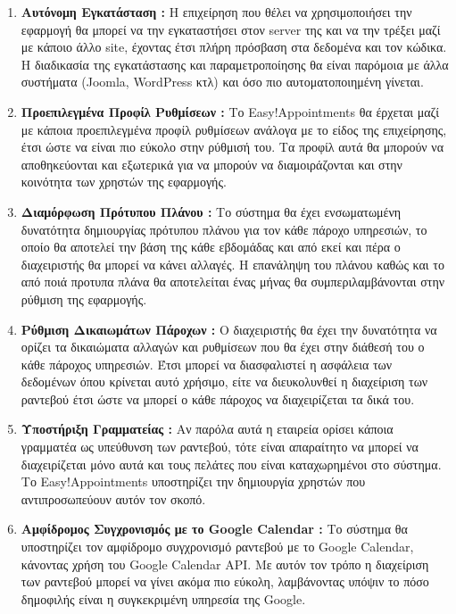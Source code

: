 \begin{enumerate}
\item {\bf Αυτόνομη Εγκατάσταση :} Η επιχείρηση που θέλει να χρησιμοποιήσει την εφαρμογή θα μπορεί να την εγκαταστήσει στον server της και να την τρέξει μαζί με κάποιο άλλο site, έχοντας έτσι πλήρη πρόσβαση στα δεδομένα και τον κώδικα. Η διαδικασία της εγκατάστασης και παραμετροποίησης θα είναι παρόμοια με άλλα συστήματα (Joomla, WordPress κτλ) και όσο πιο αυτοματοποιημένη γίνεται.

\item {\bf Προεπιλεγμένα Προφίλ Ρυθμίσεων :} Το Easy!Appointments θα έρχεται μαζί με κάποια προεπιλεγμένα προφίλ ρυθμίσεων ανάλογα με το είδος της επιχείρησης, έτσι ώστε να είναι πιο εύκολο στην ρύθμισή του. Τα προφίλ αυτά θα μπορούν να αποθηκεύονται και εξωτερικά για να μπορούν να διαμοιράζονται και στην κοινότητα των χρηστών της εφαρμογής.

\item {\bf Διαμόρφωση Πρότυπου Πλάνου :} Το σύστημα θα έχει ενσωματωμένη δυνατότητα δημιουργίας πρότυπου πλάνου για τον κάθε πάροχο υπηρεσιών, το οποίο θα αποτελεί την βάση της κάθε εβδομάδας και από εκεί και πέρα ο διαχειριστής θα μπορεί να κάνει αλλαγές. Η επανάληψη του πλάνου καθώς και το από ποιά προτυπα πλάνα θα αποτελείται ένας μήνας θα συμπεριλαμβάνονται στην ρύθμιση της εφαρμογής.

\item {\bf Ρύθμιση Δικαιωμάτων Πάροχων :} Ο διαχειριστής θα έχει την δυνατότητα να ορίζει τα δικαιώματα αλλαγών και ρυθμίσεων που θα έχει στην διάθεσή του ο κάθε πάροχος υπηρεσιών. Έτσι μπορεί να διασφαλιστεί η ασφάλεια των δεδομένων όπου κρίνεται αυτό χρήσιμο, είτε να διευκολυνθεί η διαχείριση των ραντεβού έτσι ώστε να μπορεί ο κάθε πάροχος να διαχειρίζεται τα δικά του.

\item {\bf Υποστήριξη Γραμματείας :} Αν παρόλα αυτά η εταιρεία ορίσει κάποια γραμματέα ως υπεύθυνση των ραντεβού, τότε είναι απαραίτητο να μπορεί να διαχειρίζεται μόνο αυτά και τους πελάτες που είναι καταχωρημένοι στο σύστημα. Το Easy!Appointments υποστηρίζει την δημιουργία χρηστών που αντιπροσωπεύουν αυτόν τον σκοπό.

\item {\bf Αμφίδρομος Συγχρονισμός με το Google Calendar :} Το σύστημα θα υποστηρίζει τον αμφίδρομο συγχρονισμό ραντεβού με το Google Calendar, κάνοντας χρήση του Google Calendar API. Με αυτόν τον τρόπο η διαχείριση των ραντεβού μπορεί να γίνει ακόμα πιο εύκολη, λαμβάνοντας υπόψιν το πόσο δημοφιλής είναι η συγκεκριμένη υπηρεσία της Google.
\end{enumerate}


